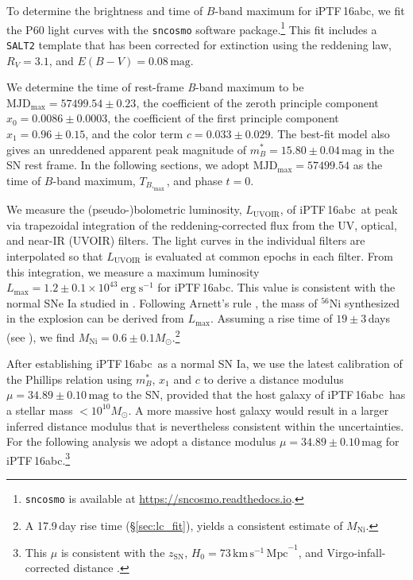 \documentclass[twocolumn]{aastex61}
\newcommand{\sm}{M_\odot}
\newcommand{\abc}{iPTF\,16abc}
\begin{document}
To determine the brightness and time of $B$-band maximum for \abc, we fit
the P60 light curves with the \texttt{sncosmo} software
package.\footnote{\texttt{sncosmo} is available at
\url{https://sncosmo.readthedocs.io}.} This fit includes a \texttt{SALT2}
template \citep{2007A&A...466...11G} that has been corrected for extinction
using the \citet{1999PASP..111...63F} reddening law, $R_V=3.1$, and $E(B-V)
= 0.08 \, \mathrm{mag}$.

We determine the time of rest-frame \textit{B}-band maximum to be
$\textrm{MJD}_\mathrm{max}=57499.54\pm0.23$, the coefficient of the zeroth
principle component $x_0 = 0.0086 \pm 0.0003$, the coefficient of the first
principle component $x_1 = 0.96 \pm 0.15$, and the color term $c = 0.033 \pm
0.029$. The best-fit model also gives an unreddened apparent peak magnitude
of $m^*_{B}=15.80 \pm 0.04 \,\textrm{mag}$ in the SN rest frame. In the
following sections, we adopt $\textrm{MJD}_\mathrm{max}=57499.54$ as the
time of $B$-band maximum, $T_{B,_\mathrm{max}}$, and phase $t=0$.

We measure the (pseudo-)bolometric luminosity, $L_\mathrm{UVOIR}$, of \abc\
at peak via trapezoidal integration of the reddening-corrected flux from the
UV, optical, and near-IR (UVOIR) filters. The light curves in the individual
filters are interpolated so that $L_\mathrm{UVOIR}$ is evaluated at common
epochs in each filter. From this integration, we measure a maximum
luminosity $L_\mathrm{max} = 1.2 \pm 0.1 \times 10^{43} \; \mathrm{erg \;
s}^{-1}$ for \abc. This value is consistent with the normal SNe Ia studied
in \citet{2016A&A...588A..84D}. Following Arnett's rule
\citep{1982ApJ...253..785A, 1985Natur.314..337A}, the mass of $^{56}$Ni
synthesized in the explosion can be derived from $L_\mathrm{max}$. Assuming
a rise time of $19 \pm 3$\,days (see \citealt{2006A&A...450..241S}), we find
$M_\mathrm{Ni} = 0.6 \pm 0.1 M_\odot$.\footnote{A 17.9\,day rise time
(\S\ref{sec:lc_fit}), yields a consistent estimate of $M_\mathrm{Ni}$.}

After establishing \abc\ as a normal SN Ia, we use the latest calibration
\citep{2014A&A...568A..22B} of the Phillips relation
\citep{1993ApJ...413L.105P} using $m^*_{B}$, $x_1$ and $c$ to derive a
distance modulus $\mu = 34.89 \pm 0.10 \,\textrm{mag}$ to the SN, provided
that the host galaxy of \abc\ has a stellar mass $< 10^{10}\sm$. A more
massive host galaxy would result in a larger inferred distance modulus that
is nevertheless consistent within the uncertainties. For the following
analysis we adopt a distance modulus $\mu = 34.89 \pm 0.10 \,\textrm{mag}$
for \abc.\footnote{This $\mu$ is consistent with the $z_\mathrm{SN}$, $H_0 =
73 \, \mathrm{km \, s^{-1} \, Mpc}^{-1}$, and Virgo-infall-corrected
distance \citep{2000ApJ...529..786M}.}
\end{document}
